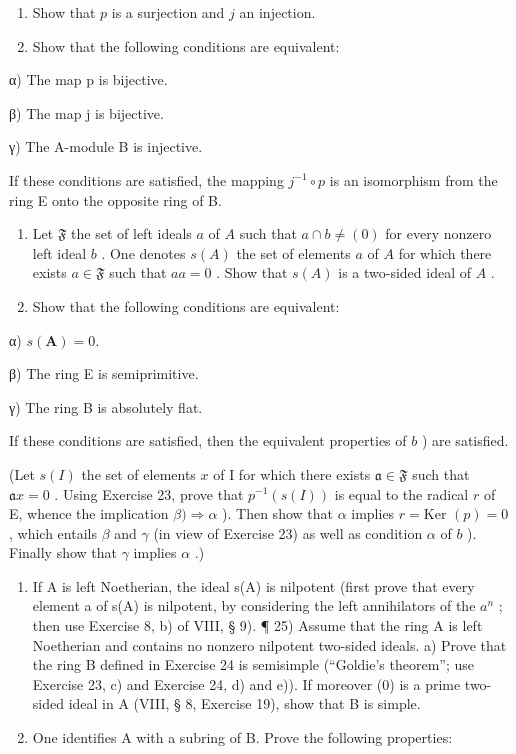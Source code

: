 \begin{enumerate}
\def\labelenumi{\alph{enumi})}
\item
  Show that \(p\) is a surjection and \(j\) an injection.
\item
  Show that the following conditions are equivalent:
\end{enumerate}

α) The map p is bijective.

β) The map j is bijective.

γ) The A-module B is injective.

If these conditions are satisfied, the mapping \(j^{-1} \circ p\) is an isomorphism from the ring E onto the opposite ring of B.

\begin{enumerate}
\def\labelenumi{\alph{enumi})}
\setcounter{enumi}{2}
\item
  Let \(\mathfrak{F}\) the set of left ideals \(a\) of \(A\) such that \(a \cap b \neq (0)\) for every nonzero left ideal \(b\) . One denotes \(s(A)\) the set of elements \(a\) of \(A\) for which there exists \(a \in \mathfrak{F}\) such that \(aa = 0\) . Show that \(s(A)\) is a two-sided ideal of \(A\) .
\item
  Show that the following conditions are equivalent:
\end{enumerate}

α) \(s(\mathbf{A}) = 0.\)

β) The ring E is semiprimitive.

γ) The ring B is absolutely flat.

If these conditions are satisfied, then the equivalent properties of \(b\) ) are satisfied.

(Let \(s(I)\) the set of elements \(x\) of I for which there exists \(\mathfrak{a} \in \mathfrak{F}\) such that \(\mathfrak{a} x = 0\) . Using Exercise 23, prove that \(p^{-1}(s(I))\) is equal to the radical \(r\) of E, whence the implication \(\beta) \Rightarrow \alpha\) ). Then show that \(\alpha\) implies \(r = \text{Ker } (p) = 0\) , which entails \(\beta\) and \(\gamma\) (in view of Exercise 23) as well as condition \(\alpha\) of \(b\) ). Finally show that \(\gamma\) implies \(\alpha\) .)

\begin{enumerate}
\def\labelenumi{\alph{enumi})}
\setcounter{enumi}{4}
\item
  If A is left Noetherian, the ideal s(A) is nilpotent (first prove that every element a of s(A) is nilpotent, by considering the left annihilators of the \(a^{n}\) ; then use Exercise 8, b) of VIII, § 9). ¶ 25) Assume that the ring A is left Noetherian and contains no nonzero nilpotent two-sided ideals. a) Prove that the ring B defined in Exercise 24 is semisimple (“Goldie's theorem”; use Exercise 23, c) and Exercise 24, d) and e)). If moreover (0) is a prime two-sided ideal in A (VIII, § 8, Exercise 19), show that B is simple.
\item
  One identifies A with a subring of B. Prove the following properties:
\end{enumerate}

